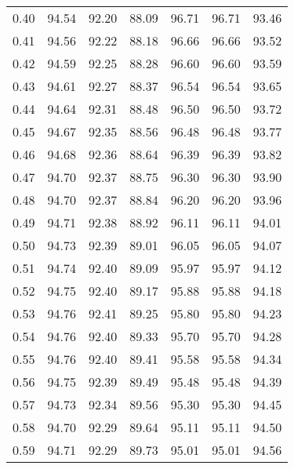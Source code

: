 \begin{tabular}{|c|c|c|c|c|c|c|}
      0.40 &     94.54 &     92.20 &      88.09 &   96.71 &      96.71 &         93.46 \\
      0.41 &     94.56 &     92.22 &      88.18 &   96.66 &      96.66 &         93.52 \\
      0.42 &     94.59 &     92.25 &      88.28 &   96.60 &      96.60 &         93.59 \\
      0.43 &     94.61 &     92.27 &      88.37 &   96.54 &      96.54 &         93.65 \\
      0.44 &     94.64 &     92.31 &      88.48 &   96.50 &      96.50 &         93.72 \\
      0.45 &     94.67 &     92.35 &      88.56 &   96.48 &      96.48 &         93.77 \\
      0.46 &     94.68 &     92.36 &      88.64 &   96.39 &      96.39 &         93.82 \\
      0.47 &     94.70 &     92.37 &      88.75 &   96.30 &      96.30 &         93.90 \\
      0.48 &     94.70 &     92.37 &      88.84 &   96.20 &      96.20 &         93.96 \\
      0.49 &     94.71 &     92.38 &      88.92 &   96.11 &      96.11 &         94.01 \\
      0.50 &     94.73 &     92.39 &      89.01 &   96.05 &      96.05 &         94.07 \\
      0.51 &     94.74 &     92.40 &      89.09 &   95.97 &      95.97 &         94.12 \\
      0.52 &     94.75 &     92.40 &      89.17 &   95.88 &      95.88 &         94.18 \\
      0.53 &     94.76 &     92.41 &      89.25 &   95.80 &      95.80 &         94.23 \\
      0.54 &     94.76 &     92.40 &      89.33 &   95.70 &      95.70 &         94.28 \\
      0.55 &     94.76 &     92.40 &      89.41 &   95.58 &      95.58 &         94.34 \\
      0.56 &     94.75 &     92.39 &      89.49 &   95.48 &      95.48 &         94.39 \\
      0.57 &     94.73 &     92.34 &      89.56 &   95.30 &      95.30 &         94.45 \\
      0.58 &     94.70 &     92.29 &      89.64 &   95.11 &      95.11 &         94.50 \\
      0.59 &     94.71 &     92.29 &      89.73 &   95.01 &      95.01 &         94.56 \\

\end{tabular}
